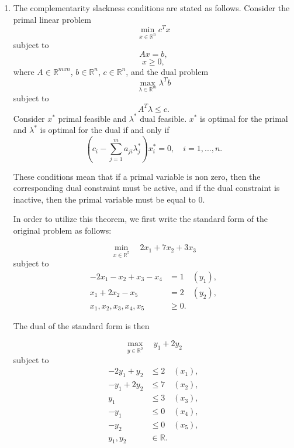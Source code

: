 \begin{enumerate}
The graphical solution to the dual problem is given in the above figure. The optimal solution to the dual denoted by point $E$ is
\[
\rvect{y^*_1 \\ y^*_2}= \rvect{3 \\ 5},
\]
and the optimal objective function value is $13$.


\item The complementarity slackness conditions are stated as follows. 
Consider the primal linear problem
\[
\min_{x \in \mathbb{R}^n} c^{T}x
\]
subject to
\[
Ax = b,
\]
\[
x \geq 0,
\]
where $A \in \mathbb{R}^{m x n}$, $b \in \mathbb{R}^n$, $c \in \mathbb{R}^n$, and the dual problem
\[
\max_{\lambda \in \mathbb{R}^m} \lambda^{T}b
\]
subject to
\[
A^T \lambda \leq c .
\]
Consider $x^*$ primal feasible and $\lambda^*$ dual feasible. $x^*$ is optimal for the primal and $\lambda^*$ is optimal for the dual if and only if
\[
(c_i - \sum_{j=1}^{m} a_{ji} \lambda_j^*) x_i^* = 0,  \quad  i=1,...,n.
\]

These conditions mean that if a primal variable is non zero, then the
corresponding dual constraint must be active, and if the dual
constraint is inactive, then the primal variable must be equal to
$0$. 

In order to utilize this theorem, we first write the standard form of the original problem as follows:

%
%

\[
\min_{x \in \mathbb{R}^5} \quad 2x_1 + 7x_2+ 3x_3
\]
subject to
\begin{align*}
-2x_1-x_2+x_3-x_4 &= 1 \quad (y_1), \\
x_1+2x_2-x_5 &= 2 \quad (y_2), \\
x_1,x_2,x_3,x_4,x_5 &\geq 0.
\end{align*}

The dual of the standard form is then

\[
\max_{y \in \mathbb{R}^2} \quad y_1 + 2y_2
\]
subject to
\begin{align*}
-2y_1+y_2 &\leq 2 \quad (x_1),\\
-y_1+2y_2 &\leq 7 \quad (x_2),\\
y_1 &\leq 3 \quad (x_3),\\
-y_1 &\leq 0 \quad (x_4),\\
-y_2 &\leq 0 \quad (x_5),\\
y_1,y_2& \in \mathbb{R}.
\end{align*}


\end{enumerate}
